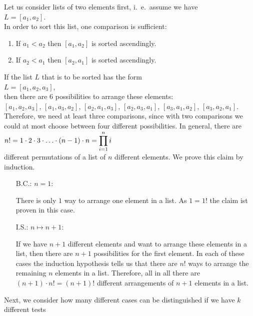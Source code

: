 Let us consider lists of two elements first, i.~e.~assume we have
\\[0.2cm]
\hspace*{1.3cm}
$L = [a_1, a_2]$.  
\\[0.2cm]
In order to sort this list, one comparison is sufficient:
\begin{enumerate}
 \item If $a_1 < a_2$ then $[a_1, a_2]$ is sorted ascendingly.
 \item If $a_2 < a_1$ then $[a_2, a_1]$ is sorted ascendingly.
\end{enumerate}
If the list $L$ that is to be sorted has the form
\\[0.2cm]
\hspace*{1.3cm}
$L = [a_1,a_2,a_3]$,
\\[0.2cm]
then there are 6 possibilities to arrange these elements:
\\[0.2cm]
\hspace*{0.3cm}
$[a_1,a_2,a_3]$, \quad
$[a_1,a_3,a_2]$, \quad
$[a_2,a_1,a_3]$, \quad
$[a_2,a_3,a_1]$, \quad
$[a_3,a_1,a_2]$, \quad
$[a_3,a_2,a_1]$. 
\\[0.2cm]
Therefore, we need at least three comparisons, since with two comparisons we could at most choose between
four different possibilities.  In general, there are 
\\[0.2cm]
\hspace*{1.3cm}
$\displaystyle n! = 1 \cdot 2 \cdot 3 \cdot {\dots} \cdot (n-1) \cdot n = \prod\limits_{i=1}^n i$ 
\\[0.2cm]
different permutations of a list of $n$ different elements. 
We prove this claim by induction. 
\begin{enumerate}
\item[B.C.:] $n=1$:  

      There is only $1$ way to arrange one element in a list.  As $1 = 1!$ the claim ist proven
      in this case.
\item[I.S.:] $n \mapsto n+1$:
  
      If we have $n+1$ different elements and want to arrange these elements in a list, then there
      are $n+1$ possibilities for the first element.  In each of these cases the induction
      hypothesis tells us that there are $n!$ ways to arrange the remaining $n$ elements in a list.
      Therefore, all in all there are $(n+1) \cdot n! = (n+1)!$ different arrangements of $n+1$
      elements in a list.
\end{enumerate}
Next, we consider how many different cases can be distinguished if we have $k$ different tests
